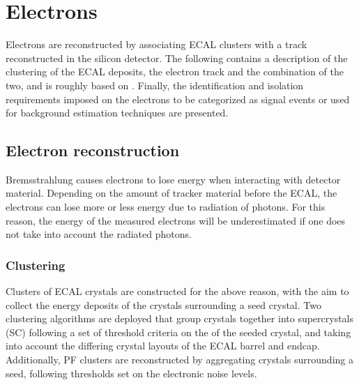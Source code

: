\section{Electrons}
\noindent\justify
\label{subsub:electrons}
Electrons are reconstructed by associating ECAL clusters with a track reconstructed in the silicon detector. 
The following contains a description of the clustering of the ECAL deposits, the electron track and the combination of the two, and is roughly based on \cite{Khachatryan:2015hwa}. 
Finally, the identification and isolation requirements imposed on the electrons to be categorized as signal events or used for background estimation techniques are presented. 
\subsection*{Electron reconstruction}
\noindent\justify
Bremsstrahlung causes electrons to lose energy when interacting with detector material. 
Depending on the amount of tracker material before the ECAL, the electrons can lose more or less energy due to radiation of photons. 
For this reason, the energy of the measured electrons will be underestimated if one does not take into account the radiated photons. 
\subsubsection*{Clustering}
\noindent\justify
Clusters of ECAL crystals are constructed for the above reason, with the aim to collect the energy deposits of the crystals surrounding a seed crystal. 
Two clustering algorithms are deployed that group crystals together into supercrystals (SC) following a set of threshold criteria on the \ET of the seeded crystal, and taking into account the differing crystal layouts of the ECAL barrel and endcap.   
Additionally, PF clusters are reconstructed by aggregating crystals surrounding a seed, following thresholds set on the electronic noise levels.  
